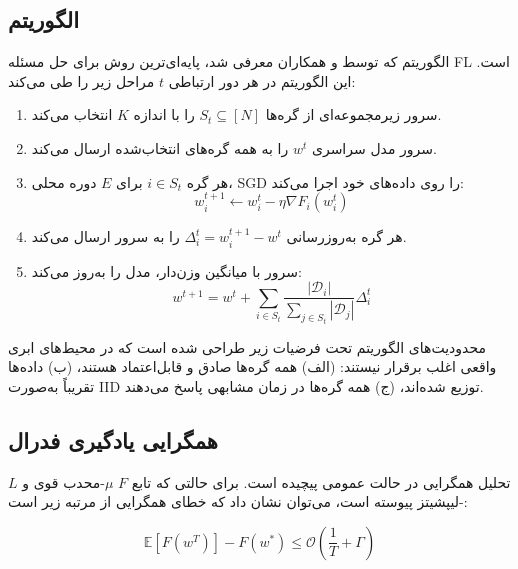 \subsection{الگوریتم }

الگوریتم  که توسط  و همکاران \cite{mcmahan2017communication} معرفی شد، پایه‌ای‌ترین روش برای حل مسئله \gls{FL} است. این الگوریتم در هر دور ارتباطی $t$ مراحل زیر را طی می‌کند:

\begin{enumerate}
    \item سرور زیرمجموعه‌ای از گره‌ها $S_t \subseteq [N]$ را با اندازه $K$ انتخاب می‌کند.
    \item سرور مدل سراسری $w^t$ را به همه گره‌های انتخاب‌شده ارسال می‌کند.
    \item هر گره $i \in S_t$ برای $E$ دوره محلی، \gls{SGD} را روی داده‌های خود اجرا می‌کند:
    \begin{equation}
        w_i^{t+1} \leftarrow w_i^t - \eta \nabla F_i(w_i^t)
        \label{eq:local_sgd}
    \end{equation}
    \item هر گره به‌روزرسانی $\Delta_i^t = w_i^{t+1} - w^t$ را به سرور ارسال می‌کند.
    \item سرور با میانگین وزن‌دار، مدل را به‌روز می‌کند:
    \begin{equation}
        w^{t+1} = w^t + \sum_{i \in S_t} \frac{|\mathcal{D}_i|}{\sum_{j \in S_t}|\mathcal{D}_j|} \Delta_i^t
        \label{eq:fedavg}
    \end{equation}
\end{enumerate}

\begin{warning}{محدودیت‌های }
    الگوریتم  تحت فرضیات زیر طراحی شده است که در محیط‌های ابری واقعی اغلب برقرار نیستند: (الف) همه گره‌ها صادق و قابل‌اعتماد هستند، (ب) داده‌ها تقریباً به‌صورت \gls{IID} توزیع شده‌اند، (ج) همه گره‌ها در زمان مشابهی پاسخ می‌دهند.
\end{warning}

\subsection{همگرایی یادگیری فدرال}

تحلیل همگرایی  در حالت عمومی پیچیده است. برای حالتی که تابع $F$ $\mu$-محدب قوی و $L$-لیپشیتز پیوسته است، می‌توان نشان داد که خطای همگرایی از مرتبه زیر است:

\begin{equation}
    \mathbb{E}[F(w^T)] - F(w^*) \leq \mathcal{O}\left(\frac{1}{T} + \Gamma\right)
    \label{eq:convergence}
\end{equation}

